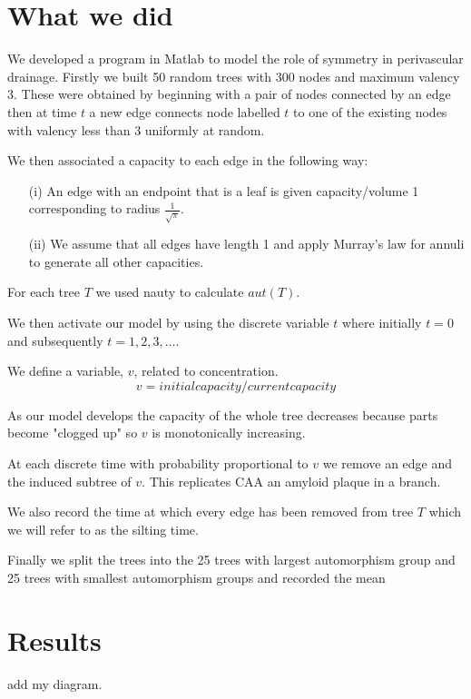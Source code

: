 \documentclass[12pt]{article} %
\theoremstyle{definition}
\begin{document}
\section{What we did}
We developed a program in Matlab \cite{} to model the role of symmetry in perivascular drainage. 
Firstly we built 50 random trees with 300 nodes and maximum valency 3.  These were obtained by beginning 
with a pair of nodes connected by an edge then at time $t$ a new edge connects node labelled $t$ to one of 
the existing %
nodes with valency less than 3 uniformly at random.  

We then associated a capacity to each edge in the following way:
\begin{itemize}

\item[(i)] An edge with an endpoint that is a leaf is given capacity/volume 1 corresponding to radius $\frac{1}{\sqrt{\pi}}$.

\item[(ii)] We assume that all edges have length 1 and apply Murray's law for annuli to generate all other 
capacities.


\end{itemize}
For each tree $T$ we used nauty \cite{nauty} to calculate $aut(T)$.

We then activate our model by using the discrete variable $t$ where initially $t = 0$ and subsequently $t =
1,2,3,\dots$.

We define a variable, $v$, related to concentration. %
\[v = initial capacity/current capacity\]

As our model develops the capacity of the whole tree decreases because parts become "clogged up" so $v$ is 
monotonically increasing.

At each discrete time with probability proportional to $v$ we remove an edge and the induced subtree of 
$v$. This replicates CAA an amyloid plaque in a branch.  

We also record the time at which every edge has been removed from tree $T$ which we will refer to as the 
silting time.

Finally we split the trees into the 25 trees with largest automorphism group and 25 trees with smallest automorphism groups
and recorded the mean 

\section{Results}  
add my diagram.
\end{document}
